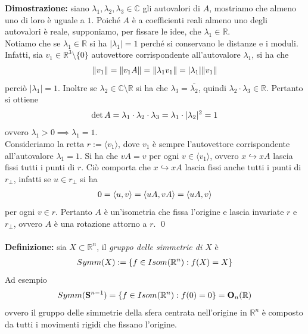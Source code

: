 \documentclass{article}
\begin{document}
\textbf{Dimostrazione:} siano $\lambda_1, \lambda_2, \lambda_3 \in \mathbb{C}$ gli autovalori di $A$, mostriamo che almeno uno di loro è uguale a $1$. Poiché $A$ è a coefficienti reali almeno uno degli autovalori è reale, supponiamo, per fissare le idee, che $\lambda_1 \in \mathbb{R}$. \\
Notiamo che se $\lambda_1 \in \mathbb{R}$ si ha $|\lambda_1| = 1$ perché si conservano le distanze e i moduli. Infatti, sia $v_1 \in \mathbb{R}^3 \setminus \{ 0 \}$ autovettore corrispondente all'autovalore $\lambda_1$, si ha che
\begin{gather}
    \| v_1 \| = \| v_1A \| = \| \lambda_1 v_1 \| = |\lambda_1|\| v_1 \| \notag
\end{gather}
perciò $|\lambda_1| = 1$. Inoltre se $\lambda_2 \in \mathbb{C} \setminus \mathbb{R}$ si ha che $\lambda_3 = \overline{\lambda_2}$, quindi $\lambda_2 \cdot \lambda_3 \in \mathbb{R}$. Pertanto si ottiene
\begin{gather}
    \det A = \lambda_1 \cdot \lambda_2 \cdot \lambda_3 = \lambda_1 \cdot |\lambda_2|^2 = 1 \notag
\end{gather}
ovvero $\lambda_1 > 0 \implies \lambda_1 = 1$. \\
Consideriamo la retta $r := \langle v_1 \rangle$, dove $v_1$ è sempre l'autovettore corrispondente all'autovalore $\lambda_1 = 1$. Si ha che $vA = v$ per ogni $v \in \langle v_1 \rangle$, ovvero $x \hookrightarrow xA$ lascia fissi tutti i punti di $r$. Ciò comporta che $x \hookrightarrow xA$ lascia fissi anche tutti i punti di $r_\perp$, infatti se $u \in r_\perp$ si ha
\begin{gather}
    0 = \langle u, v \rangle = \langle uA, vA \rangle = \langle uA, v \rangle \notag
\end{gather}
per ogni $v \in r$. Pertanto $A$ è un'isometria che fissa l'origine e lascia invariate $r$ e $r_\perp$, ovvero $A$ è una rotazione attorno a $r$. \qed \\ \\
\textbf{Definizione:} sia $X \subset \mathbb{R}^n$, il \textit{gruppo delle simmetrie di $X$} è
\begin{gather}
    Symm(X) := \{ f \in Isom(\mathbb{R}^n) : f(X) = X \} \notag
\end{gather}
Ad esempio
\begin{gather}
    Symm(\mathbf{S}^{n - 1}) = \{ f \in Isom(\mathbb{R}^n) : f(0) = 0 \} = \mathbf{O}_n(\mathbb{R}) \notag
\end{gather}
ovvero il gruppo delle simmetrie della sfera centrata nell'origine in $\mathbb{R}^n$ è composto da tutti i movimenti rigidi che fissano l'origine. \\ \\
\end{document}
